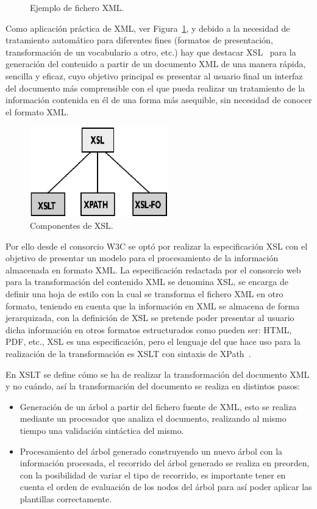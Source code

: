 \begin{description}
\begin{figure}[!htbp]
\centering

\caption{Ejemplo de fichero XML.}
\label{fig:ejemplo-xml}
\end{figure}

Como aplicación práctica de XML, ver Figura~\ref{fig:ejemplo-xml}, y debido a la necesidad de tratamiento
automático para diferentes fines (formatos de presentación, transformación de un
vocabulario a otro, etc.) hay que destacar \gls{XSL}~\cite{XSL} para la generación del
contenido a partir de un documento XML de una manera rápida, sencilla y eficaz, cuyo objetivo principal es presentar al usuario final un 
interfaz del documento más comprensible con el que pueda realizar un tratamiento de la información contenida en él de una forma más
asequible, sin necesidad de conocer el formato XML.

\begin{figure}[!htbp]
\centering
	\includegraphics[width=6cm]{images/xsl}
\caption{Componentes de XSL.}
\label{fig:xsl}
\end{figure}

Por ello desde el consorcio \gls{W3C} se optó por realizar la especificación XSL con
el objetivo de presentar un modelo para el procesamiento de la información
almacenada en formato XML. La especificación redactada por el consorcio web para la transformación del contenido XML
se denomina XSL, se encarga de definir una hoja de estilo con la cual se transforma el fichero
XML en otro formato, teniendo en cuenta que la información en XML se almacena de forma
jerarquizada, con la definición de XSL se pretende poder presentar al usuario dicha información
en otros formatos estructurados como pueden ser: HTML, \gls{PDF}, etc., XSL es una especificación, pero 
el lenguaje del que hace uso para la realización de la transformación es XSLT con sintaxis de XPath~\cite{XPath}.

En \gls{XSLT} se define cómo se ha de realizar la transformación del documento XML y no
cuándo, así la transformación del documento se realiza en distintos pasos: 
\begin{itemize}
    \item Generación de un árbol a partir del fichero fuente de XML, esto se
    realiza mediante un procesador que analiza el documento, realizando al mismo tiempo una validación sintáctica del
mismo.
\item Procesamiento del árbol generado construyendo un nuevo árbol con la
información procesada, el recorrido del árbol generado se realiza en preorden, con la posibilidad de variar el tipo de recorrido, es importante tener en cuenta
el orden de evaluación de los nodos del árbol para así poder aplicar las
plantillas correctamente. 
\end{itemize}


\end{description}
